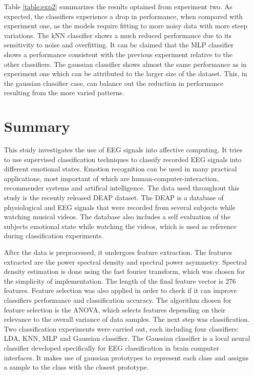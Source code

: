 \documentclass[12pt, a4paper, fleqn]{memoir}%
\begin{document}
Table \ref{table:exp2} summarizes the results optained from experiment two. As expected, the classifiers experience a drop in performance, when compared with experiment one, as the models require fitting to more noisy data with more steep variations. The kNN classifier shows a much reduced performance due to its sensitivity to noise and overfitting. It can be claimed that the MLP classifier shows a performance consistent with the previous experiment relative to the other classifiers. The gaussian classifier shows almost the same performance as in experiment one which can be attributed to the larger size of the dataset. This, in the gaussian classifier case, can balance out the reduction in performance resulting from the more varied patterns. 
\chapter{Summary}
This study investigates the use of EEG signals into affective computing. It tries to use supervised classification techniques to classify recorded EEG signals into different emotional states. Emotion recognition can be used in many practical applications, most important of which are human-computer-interaction, recommender systems and artifical intelligence. The data used throughout this study is the recently released DEAP dataset. The DEAP is a database of physiological and EEG signals that were recorded from several subjects while watching musical videos. The database also includes a self evaluation of the subjects emotional state while watching the videos, which is used as reference during classification experiments.

After the data is preprocessed, it undergoes feature extraction. The features extracted are the power spectral density and spectral power asymmetry. Spectral density estimation is done using the fast fourier transform, which was chosen for the simplicity of implementation. The length of the final feature vector is 276 features. Feature selection was also applied in order to check if it can improve classifiers performance and classification accuracy. The algorithm chosen for feature selection is the ANOVA, which selects features depending on their relevance to the overall variance of data samples. The next step was classification. Two classification experiments were carried out, each including four classifiers: LDA, KNN, MLP and Gaussian classifier. The Gaussian classifier is a local neural classifier developed specifically for EEG classification in brain computer interfaces. It makes use of gaussian prototypes to represent each class and assigns a sample to the class with the closest prototype. 
\end{document}
